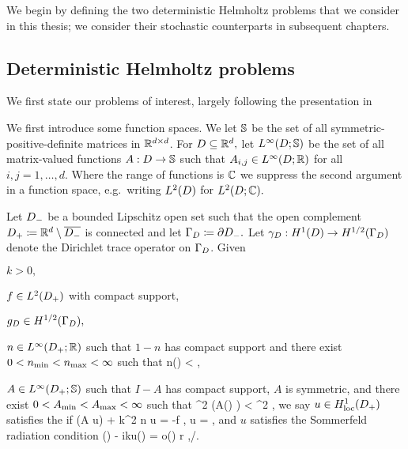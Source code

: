   We  begin by defining the two deterministic Helmholtz problems that we consider in this thesis; we  consider their stochastic counterparts in subsequent chapters.

\subsection{Deterministic Helmholtz problems}\label{sec:detprobs}

We first state our problems of interest, largely following the presentation in \cite{GrPeSp:19}

We first introduce some function spaces. We let $\mathbb S$ be the set of all symmetric-positive-definite matrices in $\mathbb R^{d\times d}$. For $D \subseteq \mathbb R^{d},$ let $\LiDRRdtd$ be the set of all matrix-valued functions $A:D\rightarrow\mathbb S$ such that $A_{i,j} \in \LiDRR$ for all $i,j =   1,\ldots,d.$ Where the range of functions is $\mathbb C$ we suppress the second argument in a function space, e.g.~writing $\LtD$ for $\LtDCC.$

  \label{prob:edp}
  Let $D_{-}$ be a bounded Lipschitz open set such that the open complement $D_{+} \coloneqq \mathbb R^{d} \setminus \overline{D_{-}}$ is connected and let $\Gamma_{D} \coloneqq \partial D_{-}.$ Let $\trD:\HoD\rightarrow\HhGD$ denote the Dirichlet trace operator on $\Gamma_{D}$. Given
  \bit
  \item $k > 0,$
\item $f \in \LtDp$ with compact support,
\item $\gD \in \HhGD,$
\item $n \in \LiDpRR$ such that $1-n$ has compact support and there exist $0 < n_{\min} < n_{\max} < \infty$ such that
  \beq\label{eq:nbounds}
\nmin \leq n(\bx) < \nmax \tfae \bx \in \Dp,
  \eeq
\item $A \in \LiDpRRdtd$ such that $I-A$ has compact support, $A$ is symmetric, and there exist $0 < A_{\min} < A_{\max} < \infty$ such that
  \beq\label{eq:Abounds}
\Amin \abs{\bxi}^2 \leq \mleft(A(\bx) \bxi \mright) \cdot \bxibar < \Amax \abs{\bxi}^2 \tfa \bxi \in \CCd \tfae \bx \in \Dp,
  \eeq
  \eit
  we say $u \in \HolocDp$ satisfies the  if
  \beq\label{eq:hhedp}
\grad \cdot \mleft(A \grad u\mright) + k^2 n u = -f \tin \Dp,
\eeq
\beq\label{eq:dbc}
\trGD u = \gD,
\eeq
and $u$ satisfies the Sommerfeld radiation condition
\beq\label{eq:sommerfeld}
\dudr(\bx) - iku(\bx) = o\mleft(\mright) r \de \abs{\bx} \rightarrow \infty,\bxhat \de \bx/\abs{\bx}.
\eeq
\eprob

